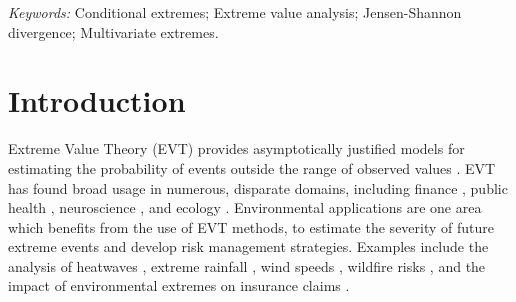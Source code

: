 \documentclass[preprint,12pt,authoryear]{elsarticle}
\begin{document}
\noindent%
{\it Keywords:} Conditional extremes; Extreme value analysis; Jensen-Shannon divergence; Multivariate extremes.
\vfill

\newpage
{} %

\setlength{\textfloatsep}{10pt plus 1pt minus 2pt}
\setlength{\intextsep}{8pt plus 1pt minus 2pt}
\setlength{\floatsep}{8pt plus 1pt minus 2pt}

\setlength{\abovedisplayskip}{8pt plus 2pt minus 4pt}
\setlength{\belowdisplayskip}{8pt plus 2pt minus 4pt}
\setlength{\abovedisplayshortskip}{4pt plus 2pt minus 4pt}
\setlength{\belowdisplayshortskip}{4pt plus 2pt minus 4pt}

\section{Introduction}
\label{sec:intro}
Extreme Value Theory (EVT) provides asymptotically justified models for estimating the probability of events outside the range of observed values \citep{Coles2001}.
EVT has found broad usage in numerous, disparate domains, including finance \citep{Poon2004}, public health \citep{Vettori2019}, neuroscience \citep{Talento2025}, and ecology \citep{Koh2025}.
Environmental applications are one area which benefits from the use of EVT methods, to estimate the severity of future extreme events and develop risk management strategies. 
Examples include the analysis of heatwaves \citep{tanarhte2015heat, french2019quantifying}, extreme rainfall \citep{osei2021estimation}, wind speeds \citep{steinkohl2013extreme, soukissian2015effect}, wildfire risks \citep{Koh2023}, and the impact of environmental extremes on insurance claims \citep{Rohrbeck_flooding_2018, Miralles2024}.
\end{document}
